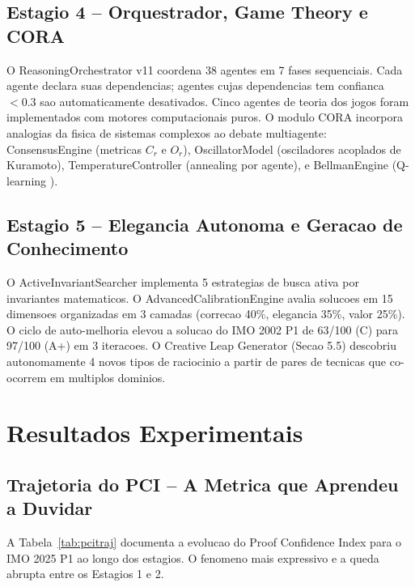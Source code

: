 \documentclass[5p]{elsarticle}
\begin{document}
\subsection{Estagio 4 -- Orquestrador, Game Theory e CORA}

O ReasoningOrchestrator v11 coordena 38 agentes em 7 fases sequenciais. Cada
agente declara suas dependencias; agentes cujas dependencias tem confianca $<0.3$
sao automaticamente desativados. Cinco agentes de teoria dos jogos \cite{nash1950,
vonneumann1944,shapley1953,smith1973} foram implementados com motores
computacionais puros. O modulo CORA \cite{macedo2025} incorpora analogias da
fisica de sistemas complexos ao debate multiagente: ConsensusEngine (metricas
$C_r$ e $O_r$), OscillatorModel (osciladores acoplados de Kuramoto),
TemperatureController (annealing por agente), e BellmanEngine (Q-learning
\cite{bellman1954,sutton1998}).

\subsection{Estagio 5 -- Elegancia Autonoma e Geracao de Conhecimento}

O ActiveInvariantSearcher implementa 5 estrategias de busca ativa por invariantes
matematicos. O AdvancedCalibrationEngine avalia solucoes em 15 dimensoes
organizadas em 3 camadas (correcao 40\%, elegancia 35\%, valor 25\%). O ciclo
de auto-melhoria elevou a solucao do IMO 2002 P1 de 63/100 (C) para 97/100 (A+)
em 3 iteracoes. O Creative Leap Generator (Secao 5.5) descobriu autonomamente
4 novos tipos de raciocinio a partir de pares de tecnicas que co-ocorrem em
multiplos dominios.

\section{Resultados Experimentais}

\subsection{Trajetoria do PCI -- A Metrica que Aprendeu a Duvidar}

A Tabela~\ref{tab:pcitraj} documenta a evolucao do Proof Confidence Index para
o IMO 2025 P1 ao longo dos estagios. O fenomeno mais expressivo e a queda
abrupta entre os Estagios 1 e 2.
\end{document}
